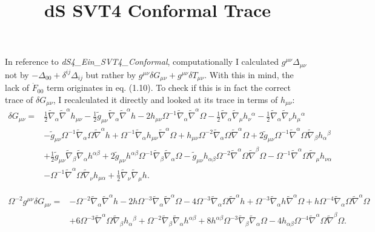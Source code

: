 \documentclass[10pt,letterpaper]{article}
\title{dS SVT4 Conformal Trace}
\date{}
\numberwithin{equation}{section}
\begin{document}
 
\maketitle
\noindent 
In reference to \emph{dS4\_Ein\_SVT4\_Conformal}, computationally I calculated $g^{\mu\nu}\Delta_{\mu\nu}$ not by $-\Delta_{00} +\delta^{ij}\Delta_{ij}$ but rather by
$g^{\mu\nu}\delta G_{\mu\nu} + g^{\mu\nu}\delta T_{\mu\nu}$. With this in mind, the lack of $\dot F_{00}$ term originates in eq. (1.10). To check if this is in fact the correct trace of $\delta G_{\mu\nu}$, I recalculated it directly and looked at its trace in terms of $h_{\mu\nu}$:
\begin{eqnarray}
\delta G_{\mu\nu}={}&\tfrac{1}{2} \tilde{\nabla}_{\alpha }\tilde{\nabla}^{\alpha }h_{\mu \nu }
-  \tfrac{1}{2} \tilde{g}_{\mu \nu } \tilde{\nabla}_{\alpha }\tilde{\nabla}^{\alpha }h
- 2 h_{\mu \nu } \Omega^{-1} \tilde{\nabla}_{\alpha }\tilde{\nabla}^{\alpha }\Omega
-  \tfrac{1}{2} \tilde{\nabla}_{\alpha }\tilde{\nabla}_{\mu }h_{\nu }{}^{\alpha }
-  \tfrac{1}{2} \tilde{\nabla}_{\alpha }\tilde{\nabla}_{\nu }h_{\mu }{}^{\alpha }\nonumber\\
& -  \tilde{g}_{\mu \nu } \Omega^{-1} \tilde{\nabla}_{\alpha }\Omega \tilde{\nabla}^{\alpha }h
+ \Omega^{-1} \tilde{\nabla}_{\alpha }h_{\mu \nu } \tilde{\nabla}^{\alpha }\Omega
+ h_{\mu \nu } \Omega^{-2} \tilde{\nabla}_{\alpha }\Omega \tilde{\nabla}^{\alpha }\Omega
+ 2 \tilde{g}_{\mu \nu } \Omega^{-1} \tilde{\nabla}^{\alpha }\Omega \tilde{\nabla}_{\beta }h_{\alpha }{}^{\beta }\nonumber\\
& + \tfrac{1}{2} \tilde{g}_{\mu \nu } \tilde{\nabla}_{\beta }\tilde{\nabla}_{\alpha }h^{\alpha \beta }
+ 2 \tilde{g}_{\mu \nu } h^{\alpha \beta } \Omega^{-1} \tilde{\nabla}_{\beta }\tilde{\nabla}_{\alpha }\Omega
-  \tilde{g}_{\mu \nu } h_{\alpha \beta } \Omega^{-2} \tilde{\nabla}^{\alpha }\Omega \tilde{\nabla}^{\beta }\Omega
-  \Omega^{-1} \tilde{\nabla}^{\alpha }\Omega \tilde{\nabla}_{\mu }h_{\nu \alpha }\nonumber\\
& -  \Omega^{-1} \tilde{\nabla}^{\alpha }\Omega \tilde{\nabla}_{\nu }h_{\mu \alpha }
+ \tfrac{1}{2} \tilde{\nabla}_{\nu }\tilde{\nabla}_{\mu }h.
\end{eqnarray}

\begin{eqnarray}
\Omega^{-2} g^{\mu\nu}\delta G_{\mu\nu}={}&- \Omega^{-2} \tilde{\nabla}_{\alpha }\tilde{\nabla}^{\alpha }h
- 2 h \Omega^{-3} \tilde{\nabla}_{\alpha }\tilde{\nabla}^{\alpha }\Omega
- 4 \Omega^{-3} \tilde{\nabla}_{\alpha }\Omega \tilde{\nabla}^{\alpha }h
+ \Omega^{-3} \tilde{\nabla}_{\alpha }h \tilde{\nabla}^{\alpha }\Omega
+ h \Omega^{-4} \tilde{\nabla}_{\alpha }\Omega \tilde{\nabla}^{\alpha }\Omega\nonumber\\
& + 6 \Omega^{-3} \tilde{\nabla}^{\alpha }\Omega \tilde{\nabla}_{\beta }h_{\alpha }{}^{\beta }
+ \Omega^{-2} \tilde{\nabla}_{\beta }\tilde{\nabla}_{\alpha }h^{\alpha \beta }
+ 8 h^{\alpha \beta } \Omega^{-3} \tilde{\nabla}_{\beta }\tilde{\nabla}_{\alpha }\Omega
- 4 h_{\alpha \beta } \Omega^{-4} \tilde{\nabla}^{\alpha }\Omega \tilde{\nabla}^{\beta }\Omega .
\end{eqnarray}
\end{document}
